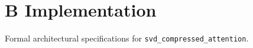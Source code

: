 \section{B Implementation}

Formal architectural specifications for \texttt{svd_compressed_attention}.
